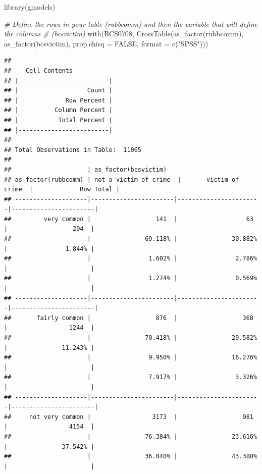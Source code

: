 \documentclass[
]{book}
\newenvironment{Shaded}{\begin{snugshade}}{\end{snugshade}}
\newcommand{\AttributeTok}[1]{\textcolor[rgb]{0.77,0.63,0.00}{#1}}
\newcommand{\CommentTok}[1]{\textcolor[rgb]{0.56,0.35,0.01}{\textit{#1}}}
\newcommand{\ConstantTok}[1]{\textcolor[rgb]{0.00,0.00,0.00}{#1}}
\newcommand{\FunctionTok}[1]{\textcolor[rgb]{0.00,0.00,0.00}{#1}}
\newcommand{\NormalTok}[1]{#1}
\newcommand{\StringTok}[1]{\textcolor[rgb]{0.31,0.60,0.02}{#1}}
\begin{document}
\begin{Shaded}
\begin{Highlighting}[]
\FunctionTok{library}\NormalTok{(gmodels)}

\CommentTok{\# Define the rows in your table (rubbcomm) and then the variable that will define the columns \# (bcsvictim)}
\FunctionTok{with}\NormalTok{(BCS0708, }\FunctionTok{CrossTable}\NormalTok{(}\FunctionTok{as\_factor}\NormalTok{(rubbcomm), }
                         \FunctionTok{as\_factor}\NormalTok{(bcsvictim), }
\AttributeTok{prop.chisq =} \ConstantTok{FALSE}\NormalTok{, }
\AttributeTok{format =} \FunctionTok{c}\NormalTok{(}\StringTok{"SPSS"}\NormalTok{)))}
\end{Highlighting}
\end{Shaded}

\begin{verbatim}
## 
##    Cell Contents
## |-------------------------|
## |                   Count |
## |             Row Percent |
## |          Column Percent |
## |           Total Percent |
## |-------------------------|
## 
## Total Observations in Table:  11065 
## 
##                     | as_factor(bcsvictim) 
## as_factor(rubbcomm) | not a victim of crime  |       victim of crime  |             Row Total | 
## --------------------|-----------------------|-----------------------|-----------------------|
##         very common |                  141  |                   63  |                  204  | 
##                     |               69.118% |               30.882% |                1.844% | 
##                     |                1.602% |                2.786% |                       | 
##                     |                1.274% |                0.569% |                       | 
## --------------------|-----------------------|-----------------------|-----------------------|
##       fairly common |                  876  |                  368  |                 1244  | 
##                     |               70.418% |               29.582% |               11.243% | 
##                     |                9.950% |               16.276% |                       | 
##                     |                7.917% |                3.326% |                       | 
## --------------------|-----------------------|-----------------------|-----------------------|
##     not very common |                 3173  |                  981  |                 4154  | 
##                     |               76.384% |               23.616% |               37.542% | 
##                     |               36.040% |               43.388% |                       | 

\end{verbatim}
\end{document}
